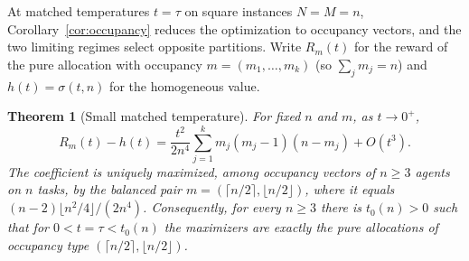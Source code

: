 \documentclass[11pt]{article}
\theoremstyle{plain}
\newtheorem{theorem}{Theorem}[section]
\theoremstyle{definition}
\theoremstyle{remark}
\begin{document}
At matched temperatures $t=\tau$ on square instances $N=M=n$, Corollary~\ref{cor:occupancy} reduces the optimization to occupancy vectors, and the two limiting regimes select opposite partitions. Write $R_m(t)$ for the reward of the pure allocation with occupancy $m=(m_1,\dots,m_k)$ (so $\sum_j m_j=n$) and $h(t)=\sigma(t,n)$ for the homogeneous value.

\begin{theorem}[Small matched temperature]\label{thm:smallt}
For fixed $n$ and $m$, as $t\to0^+$,
\begin{equation}\label{eq:smallt}
 R_m(t)-h(t)=\frac{t^2}{2n^4}\sum_{j=1}^k m_j(m_j-1)(n-m_j)+O(t^3).
\end{equation}
The coefficient is uniquely maximized, among occupancy vectors of $n\ge3$ agents on $n$ tasks, by the balanced pair $m=(\lceil n/2\rceil,\lfloor n/2\rfloor)$, where it equals $(n-2)\lfloor n^2/4\rfloor/(2n^4)$. Consequently, for every $n\ge3$ there is $t_0(n)>0$ such that for $0<t=\tau<t_0(n)$ the maximizers are exactly the pure allocations of occupancy type $(\lceil n/2\rceil,\lfloor n/2\rfloor)$.
\end{theorem}
\end{document}
